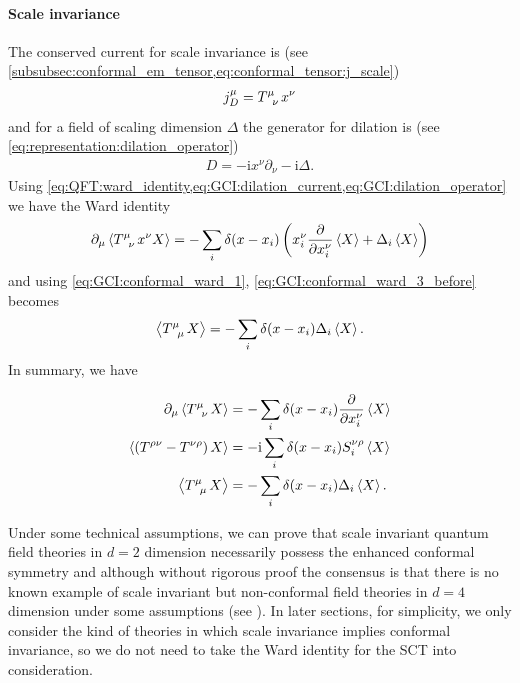 \documentclass[10pt]{article}
\newcommand{\ii}{\mathrm{i}}
\newenvironment{boxmath}[1]{\begin{tcolorbox}[enhanced,attach boxed title to top center={yshift=-\tcboxedtitleheight/2},boxrule=1pt,title={\centering #1},colframe=NavyBlue!70!black,colback=NavyBlue!10,colbacktitle=NavyBlue!10,fonttitle=\scshape,coltitle=Black]}{\end{tcolorbox}}
\begin{document}
\paragraph{Scale invariance}
The conserved current for scale invariance is (see \cref{subsubsec:conformal_em_tensor,eq:conformal_tensor:j_scale})
\begin{align}
    j_D^\mu=\tensor{T}{^\mu_\nu}x^\nu\label{eq:GCI:dilation_current}
\end{align}
and for a field of scaling dimension $\Delta$ the generator for dilation is (see \cref{eq:representation:dilation_operator})
\begin{align}
    D=-\ii x^\nu\partial_\nu-\ii\Delta.\label{eq:GCI:dilation_operator}
\end{align}
Using \cref{eq:QFT:ward_identity,eq:GCI:dilation_current,eq:GCI:dilation_operator} we have the Ward identity
\begin{align}
    \partial_\mu\expval{\tensor{T}{^\mu_\nu}x^\nu X}=-\sum_i\delta(x-x_i)\left(x_i^\nu\pdv{x_i^\nu}\expval{X}+\Delta_i\expval{X}\right)\label{eq:GCI:conformal_ward_3_before}
\end{align}
and using \cref{eq:GCI:conformal_ward_1}, \cref{eq:GCI:conformal_ward_3_before} becomes
\begin{align}
    \expval{\tensor{T}{^\mu_\mu}X}=-\sum_i\delta(x-x_i)\Delta_i\expval{X}\label{eq:GCI:conformal_ward_3}.
\end{align}
In summary, we have
\begin{boxmath}{Conformal Ward Identity}
    \begin{subequations}
        \begin{align}
            \partial_\mu\expval{\tensor{T}{^\mu_\nu}X}     & =-\sum_i\delta(x-x_i)\pdv{x^\nu_i}\expval{X}\label{eq:GCI:conformal_ward_final_1}    \\
            \expval{\left(T^{\rho\nu}-T^{\nu\rho}\right)X} & =-\ii\sum_i\delta(x-x_i)S^{\nu\rho}_i\expval{X}\label{eq:GCI:conformal_ward_final_2} \\
            \expval{\tensor{T}{^\mu_\mu}X}                 & =-\sum_i\delta(x-x_i)\Delta_i\expval{X}.\label{eq:GCI:conformal_ward_final_3}
        \end{align}
    \end{subequations}
\end{boxmath}
\begin{remark}
    Under some technical assumptions, we can prove that scale invariant quantum field theories in $d=2$ dimension necessarily possess the enhanced conformal symmetry and although without rigorous proof the consensus is that there is no known example of scale invariant but non-conformal field theories in $d=4$ dimension under some assumptions (see \cite{Nakayama:2013is}).
    In later sections, for simplicity, we only consider the kind of theories in which scale invariance implies conformal invariance, so we do not need to take the Ward identity for the SCT into consideration.
\end{remark}
\end{document}
